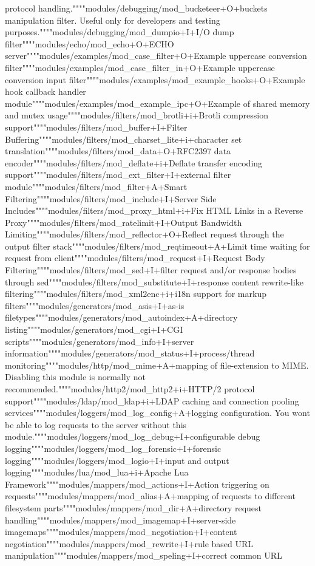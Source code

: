 protocol handling.""""modules/debugging/mod\+\_\+bucketeer+\+O+buckets manipulation filter.  Useful only for developers and testing purposes.""""modules/debugging/mod\+\_\+dumpio+\+I+\+I/\+O dump filter""""modules/echo/mod\+\_\+echo+\+O+\+E\+C\+H\+O server""""modules/examples/mod\+\_\+case\+\_\+filter+\+O+\+Example uppercase conversion filter""""modules/examples/mod\+\_\+case\+\_\+filter\+\_\+in+\+O+\+Example uppercase conversion input filter""""modules/examples/mod\+\_\+example\+\_\+hooks+\+O+\+Example hook callback handler module""""modules/examples/mod\+\_\+example\+\_\+ipc+\+O+\+Example of shared memory and mutex usage""""modules/filters/mod\+\_\+brotli+i+\+Brotli compression support""""modules/filters/mod\+\_\+buffer+\+I+\+Filter Buffering""""modules/filters/mod\+\_\+charset\+\_\+lite+i+character set translation""""modules/filters/mod\+\_\+data+\+O+\+R\+F\+C2397 data encoder""""modules/filters/mod\+\_\+deflate+i+\+Deflate transfer encoding support""""modules/filters/mod\+\_\+ext\+\_\+filter+\+I+external filter module""""modules/filters/mod\+\_\+filter+\+A+\+Smart Filtering""""modules/filters/mod\+\_\+include+\+I+\+Server Side Includes""""modules/filters/mod\+\_\+proxy\+\_\+html+i+\+Fix H\+T\+M\+L Links in a Reverse Proxy""""modules/filters/mod\+\_\+ratelimit+\+I+\+Output Bandwidth Limiting""""modules/filters/mod\+\_\+reflector+\+O+\+Reflect request through the output filter stack""""modules/filters/mod\+\_\+reqtimeout+\+A+\+Limit time waiting for request from client""""modules/filters/mod\+\_\+request+\+I+\+Request Body Filtering""""modules/filters/mod\+\_\+sed+\+I+filter request and/or response bodies through sed""""modules/filters/mod\+\_\+substitute+\+I+response content rewrite-\/like filtering""""modules/filters/mod\+\_\+xml2enc+i+i18n support for markup filters""""modules/generators/mod\+\_\+asis+\+I+as-\/is filetypes""""modules/generators/mod\+\_\+autoindex+\+A+directory listing""""modules/generators/mod\+\_\+cgi+\+I+\+C\+G\+I scripts""""modules/generators/mod\+\_\+info+\+I+server information""""modules/generators/mod\+\_\+status+\+I+process/thread monitoring""""modules/http/mod\+\_\+mime+\+A+mapping of file-\/extension to M\+I\+M\+E.  Disabling this module is normally not recommended.""""modules/http2/mod\+\_\+http2+i+\+H\+T\+T\+P/2 protocol support""""modules/ldap/mod\+\_\+ldap+i+\+L\+D\+A\+P caching and connection pooling services""""modules/loggers/mod\+\_\+log\+\_\+config+\+A+logging configuration.  You won\textquotesingle{}t be able to log requests to the server without this module.""""modules/loggers/mod\+\_\+log\+\_\+debug+\+I+configurable debug logging""""modules/loggers/mod\+\_\+log\+\_\+forensic+\+I+forensic logging""""modules/loggers/mod\+\_\+logio+\+I+input and output logging""""modules/lua/mod\+\_\+lua+i+\+Apache Lua Framework""""modules/mappers/mod\+\_\+actions+\+I+\+Action triggering on requests""""modules/mappers/mod\+\_\+alias+\+A+mapping of requests to different filesystem parts""""modules/mappers/mod\+\_\+dir+\+A+directory request handling""""modules/mappers/mod\+\_\+imagemap+\+I+server-\/side imagemaps""""modules/mappers/mod\+\_\+negotiation+\+I+content negotiation""""modules/mappers/mod\+\_\+rewrite+\+I+rule based U\+R\+L manipulation""""modules/mappers/mod\+\_\+speling+\+I+correct common U\+R\+L 